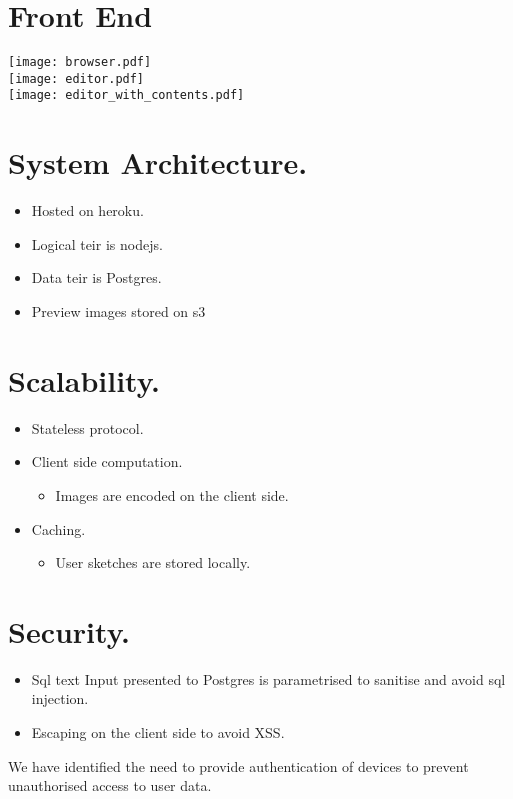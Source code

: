 \documentclass[10pt,a4paper]{article}
\begin{document}
\section*{Front End}
\texttt{[image: browser.pdf]}
\hfill\\
\texttt{[image: editor.pdf]}
\hfill\\
\texttt{[image: editor\_with\_contents.pdf]}
\newpage
\section*{System Architecture.}
\begin{itemize}
\item Hosted on heroku.
\item Logical teir is nodejs.
\item Data teir is Postgres.
\item Preview images stored on s3
\end{itemize}
\newpage
\section*{Scalability.}
		\begin{itemize}
		\item Stateless protocol.
		\item Client side computation.
		\begin{itemize}
		\item Images are encoded on the client side.
		\end{itemize}				
		\item Caching.
		\begin{itemize}
		\item User sketches are stored locally.
		\end{itemize}				
		\end{itemize}
\newpage
\section*{Security.}
	\begin{itemize}
	\item Sql text Input presented to Postgres is parametrised to sanitise and avoid sql injection.
	\item Escaping on the client side to avoid XSS.
	\end{itemize}
We have identified the need to provide authentication of devices to prevent unauthorised access to  user data.
\end{document}
